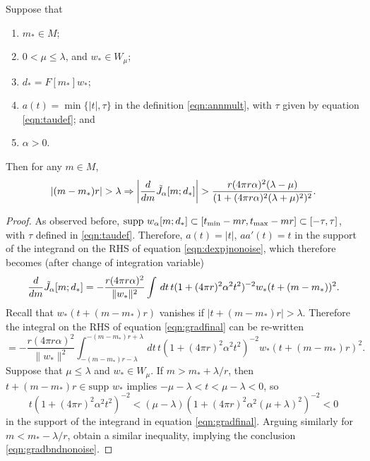 \begin{proposition}
  \label{thm:rampgood}
  Suppose that
  \begin{enumerate}
  \item $m_* \in M$;
  \item $0 < \mu \le \lambda$, and $w_* \in W_{\mu}$;
  \item $d_* = F[m_*]w_*$;
  \item $a(t)=\min\{|t|,\tau\}$ in the definition \ref{eqn:annmult},
    with $\tau$ given by equation \ref{eqn:taudef}; and
  \item $\alpha > 0$.
  \end{enumerate}
  Then for any $m \in M$, 
  \begin{equation}
    | (m - m_*)r| > \lambda  \Rightarrow  \left|\frac{d}{dm}\tilde{J}_{\alpha}[m;d_*]\right| >  
    \frac{r(4 \pi r \alpha)^2(\lambda-\mu)}{(1+(4\pi r\alpha)^2 
      (\lambda+\mu)^2)^{2}}.
    \label{eqn:gradbndnonoise}
  \end{equation}
\end{proposition}
\begin{proof}
  As observed before, $\mbox{supp }w_{\alpha}[m;d_*] \subset [t_{\rm
    min}-mr,t_{\rm max}-mr]\subset [-\tau,\tau]$, with $\tau$ defined
  in \ref{eqn:taudef}. Therefore, $a(t) = |t|$, $a a'(t) = t$ in the
  support of the integrand on the RHS of equation
  \ref{eqn:dexpjnonoise}, which therefore 
  becomes (after change of integration variable)
  \begin{equation}
    \label{eqn:gradfinal}
    \frac{d}{dm}\tilde{J}_{\alpha}[m;d_*] = -\frac{r (4\pi r\alpha)^2}{\|w_*\|^2} \int \,dt \, 
  t(1+(4\pi r)^2 \alpha^2 
  t^2)^{-2}w_*(t+(m-m_*))^2.
  \end{equation}
  Recall that $w_*(t+(m-m_*)r)$
  vanishes if $|t+(m-m_*)r| > \lambda$. Therefore the integral on the
  RHS of equation \ref{eqn:gradfinal} can be re-written
  \[
    = -\frac{r(4 \pi r \alpha)^2}{\|w_*\|^2}\int_{-(m-m_*)r-\lambda}^{-(m-m_*)r+\lambda}
    \,dt\, t(1+(4\pi r)^2\alpha^2 t^2)^{-2}w_*\left(t+(m-m_*)r\right)^2.
  \]
  Suppose that $\mu \le \lambda$ and $w_* \in W_{\mu}$. 
  If $m > m_*+\lambda/r$, then $t+(m-m_*)r \in \mbox{supp }w_*$
  implies $-\mu - \lambda < t < \mu-\lambda<0$, so 
  \[
    t(1+(4\pi r)^2\alpha^2 t^2)^{-2} < (\mu-\lambda)(1+(4\pi r)^2\alpha^2 (\mu+\lambda)^2)^{-2}<0
  \]
  in the support of the integrand in equation
  \ref{eqn:gradfinal}. Arguing similarly for $m<m_*-\lambda/r$, obtain
  a similar inequality, implying the conclusion \ref{eqn:gradbndnonoise}.
\end{proof}


